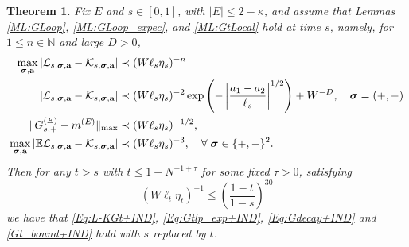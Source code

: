 \documentclass[10pt,reqno]{article}
\DeclareMathOperator{\im}{{\mathrm{Im}}}
\theoremstyle{plain} %
\newtheorem{theorem}{Theorem}[section]
\theoremstyle{remark}
\numberwithin{equation}{section}
\begin{document}
\begin{theorem}\label{lem:main_ind} Fix $E$ and $s\in[0,1]$, with $|E|\le 2-\kappa$, and assume that Lemmas \ref{ML:GLoop}, \ref{ML:GLoop_expec}, and \ref{ML:GtLocal} hold at time $s$, namely, %
for $1 \le n\in \mathbb N$ and large $D>0$, 
\begin{align}\label{Eq:L-KGt+IND}
 \max_{\boldsymbol{\sigma}, \textbf{a}}\left|{\cal L}_{s, \boldsymbol{\sigma}, \textbf{a}}-{\cal K}_{s, \boldsymbol{\sigma}, \textbf{a}}\right|&\prec (W\ell_s\eta_s)^{-n}  
\\\label{Eq:Gdecay+IND}
 \left| {\cal L}_{s, \boldsymbol{\sigma}, \textbf{a}}-{\cal K}_{s, \boldsymbol{\sigma}, \textbf{a}}\right|&\prec (W\ell_s\eta_s)^{-2}\exp \left(- \left|\frac{ a_1-a_2 }{\ell_s}\right|^{1/2}\right)+W^{-D} , \quad \boldsymbol{\sigma}=(+,-)
\\\label{Gt_bound+IND}
 \|G^{(E)}_{s ,+}-m^{(E)}\|_{\max} & \prec (W\ell_s\eta_s)^{-1/2},
 \\\label{Eq:Gtlp_exp+IND}
 \max_{\boldsymbol{\sigma}, \textbf{a}}\left|\mathbb E{\cal L}_{s, \boldsymbol{\sigma}, \textbf{a}}-{\cal K}_{s, \boldsymbol{\sigma}, \textbf{a}}\right|&\prec (W\ell_s\eta_s)^{-3},\quad  \forall\; \boldsymbol{\sigma}\in \{+,-\}^2.
\end{align}
 Then for any $t>s$ with $t\le 1-N^{-1+\tau}$ for some fixed $\tau>0$, satisfying 
\begin{equation}\label{con_st_ind}
    (W\ell_t\eta_t)^{-1}\le \left(\frac{1-t}{1-s}\right)^{30}
\end{equation}
we have that 
\eqref{Eq:L-KGt+IND}, \eqref{Eq:Gtlp_exp+IND}, \eqref{Eq:Gdecay+IND} and \eqref{Gt_bound+IND} hold with $s$  replaced by $t$.   
\end{theorem}
\end{document}
